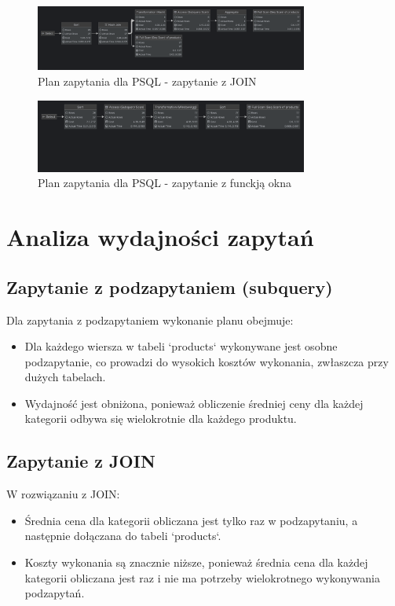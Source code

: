 \documentclass{article}
\begin{document}
\begin{figure}[H]
    \centering
    \includegraphics[width=0.8\textwidth]{../images/psql_final_join.png}
    \caption{Plan zapytania dla PSQL - zapytanie z JOIN}
\end{figure}

\begin{figure}[H]
    \centering
    \includegraphics[width=0.8\textwidth]{../images/psql_final_window.png}
    \caption{Plan zapytania dla PSQL - zapytanie z funckją okna}
\end{figure}

\section{Analiza wydajności zapytań}
\subsection{Zapytanie z podzapytaniem (subquery)}

Dla zapytania z podzapytaniem wykonanie planu obejmuje:
\begin{itemize}
    \item Dla każdego wiersza w tabeli `products` wykonywane jest osobne podzapytanie, co prowadzi do wysokich kosztów wykonania, zwłaszcza przy dużych tabelach.
    \item Wydajność jest obniżona, ponieważ obliczenie średniej ceny dla każdej kategorii odbywa się wielokrotnie dla każdego produktu.
\end{itemize}

\subsection{Zapytanie z JOIN}

W rozwiązaniu z JOIN:
\begin{itemize}
    \item Średnia cena dla kategorii obliczana jest tylko raz w podzapytaniu, a następnie dołączana do tabeli `products`.
    \item Koszty wykonania są znacznie niższe, ponieważ średnia cena dla każdej kategorii obliczana jest raz i nie ma potrzeby wielokrotnego wykonywania podzapytań.
\end{itemize}
\end{document}
